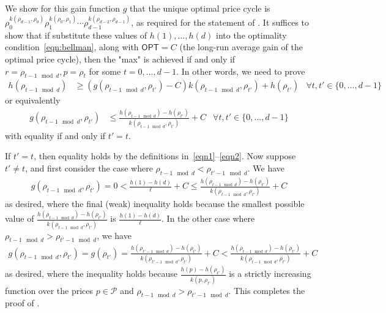 \documentclass[format=acmsmall, review=false]{acmart}
\newcommand{\OPT}{\mathsf{OPT}}
\newcommand{\cP}{\mathcal{P}}
\begin{document}
We show for this gain function $g$ that the unique optimal price cycle is $\rho_0^{k(\rho_{d-1},\rho_0)}\rho_1^{k(\rho_{0},\rho_1)}\cdots\rho_{d-1}^{k(\rho_{d-2},\rho_{d-1})}$, as required for the statement of .
It suffices to show that if substitute these values of $h(1),\ldots,h(d)$ into the optimality condition~\eqref{eqn:bellman}, along with $\OPT=C$ (the long-run average gain of the optimal price cycle), then the "max" is achieved if and only if $r=\rho_{t-1\mod d},p=\rho_t$ for some $t=0,\ldots,d-1$.  In other words, we need to prove
\begin{align*}
h(\rho_{t-1\mod d}) &\ge (g(\rho_{t-1\mod d},\rho_{t'})-C)k(\rho_{t-1\mod d},\rho_{t'})+h(\rho_{t'}) &\forall t,t'\in\{0,\ldots,d-1\}
\end{align*}
or equivalently
\begin{align} \label{eqn:toShow}
g(\rho_{t-1\mod d},\rho_{t'}) &\le \frac{h(\rho_{t-1\mod d})-h(\rho_{t'})}{k(\rho_{t-1\mod d},\rho_{t'})}+C  &\forall t,t'\in\{0,\ldots,d-1\}
\end{align}
with equality if and only if $t'=t$.

If $t'=t$, then equality holds by the definitions in~\eqref{eqn1}--\eqref{eqn2}.
Now suppose $t'\neq t$, and first consider the case where $\rho_{t-1\mod d}<\rho_{t'-1\mod d}$.
We have
\begin{align*}
g(\rho_{t-1\mod d},\rho_{t'})
=0
<\frac{h(1)-h(d)}{\ell}+C
\le\frac{h(\rho_{t-1\mod d})-h(\rho_{t'})}{k(\rho_{t-1\mod d},\rho_{t'})}+C
\end{align*}
as desired, where the final (weak) inequality holds because the smallest possible value of $\frac{h(\rho_{t-1\mod d})-h(\rho_{t'})}{k(\rho_{t-1\mod d},\rho_{t'})}$ is $\frac{h(1)-h(d)}{\ell}$.
In the other case where $\rho_{t-1\mod d}>\rho_{t'-1\mod d}$, we have
\begin{align*}
g(\rho_{t-1\mod d},\rho_{t'})=g(\rho_{t'})
=\frac{h(\rho_{t'-1\mod d})-h(\rho_{t'})}{k(\rho_{t'-1\mod d},\rho_{t'})}+C
<\frac{h(\rho_{t-1\mod d})-h(\rho_{t'})}{k(\rho_{t-1\mod d},\rho_{t'})}+C
\end{align*}
as desired, where the inequality holds because $\frac{h(p)-h(\rho_{t'})}{k(p,\rho_{t'})}$ is a strictly increasing function over the prices $p\in\cP$ and $\rho_{t-1\mod d}>\rho_{t'-1\mod d}$.
This completes the proof of .
\end{document}
